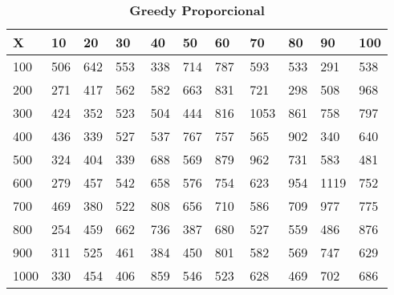 \documentclass[10pt,letterpaper]{article}
\begin{document}
\begin{center}
\begin{table}\renewcommand{\arraystretch}{2.5}
\caption{\large \textbf{Greedy Proporcional}}
\centering
\begin{tabular} { |m{0.5cm}|m{1.3cm}|m{1.3cm}|m{1.3cm}|m{1.3cm}|m{1.3cm}|m{1.3cm}|m{1.3cm}|m{1.3cm}|m{1.3cm}|m{1.3cm}|} 
\hline
\rowcolor{Gray}
\centering \textbf{X} & \centering \textbf{10} & \centering \textbf{20} & \centering \textbf{30}\ & \centering \textbf{40} & \centering \textbf{50} & \centering \textbf{60}\ & \centering \textbf{70} & \centering \textbf{80} & \centering \textbf{90}\ & \textbf{100} \\\hline
\cellcolor{Gray}100 & \Large 506 & \Large 642 & \Large 553 & \Large 338 & \Large 714 & \Large 787 & \Large 593 & \Large 533 & \Large 291 & \Large 538 \\
\hline
\cellcolor{Gray}200 & \Large 271 & \Large 417 & \Large 562 & \Large 582 & \Large 663 & \Large 831 & \Large 721 & \Large 298 & \Large 508 & \Large 968 \\
\hline
\cellcolor{Gray}300 & \Large 424 & \Large 352 & \Large 523 & \Large 504 & \Large 444 & \Large 816 & \Large 1053 & \Large 861 & \Large 758 & \Large 797 \\
\hline
\cellcolor{Gray}400 & \Large 436 & \Large 339 & \Large 527 & \Large 537 & \Large 767 & \Large 757 & \Large 565 & \Large 902 & \Large 340 & \Large 640 \\
\hline
\cellcolor{Gray}500 & \Large 324 & \Large 404 & \Large 339 & \Large 688 & \Large 569 & \Large 879 & \Large 962 & \Large 731 & \Large 583 & \Large 481 \\
\hline
\cellcolor{Gray}600 & \Large 279 & \Large 457 & \Large 542 & \Large 658 & \Large 576 & \Large 754 & \Large 623 & \Large 954 & \Large 1119 & \Large 752 \\
\hline
\cellcolor{Gray}700 & \Large 469 & \Large 380 & \Large 522 & \Large 808 & \Large 656 & \Large 710 & \Large 586 & \Large 709 & \Large 977 & \Large 775 \\
\hline
\cellcolor{Gray}800 & \Large 254 & \Large 459 & \Large 662 & \Large 736 & \Large 387 & \Large 680 & \Large 527 & \Large 559 & \Large 486 & \Large 876 \\
\hline
\cellcolor{Gray}900 & \Large 311 & \Large 525 & \Large 461 & \Large 384 & \Large 450 & \Large 801 & \Large 582 & \Large 569 & \Large 747 & \Large 629 \\
\hline
\cellcolor{Gray}1000 & \Large 330 & \Large 454 & \Large 406 & \Large 859 & \Large 546 & \Large 523 & \Large 628 & \Large 469 & \Large 702 & \Large 686 \\
\hline
\end{tabular} \\
\end{table}
\end{center}
\end{document}
